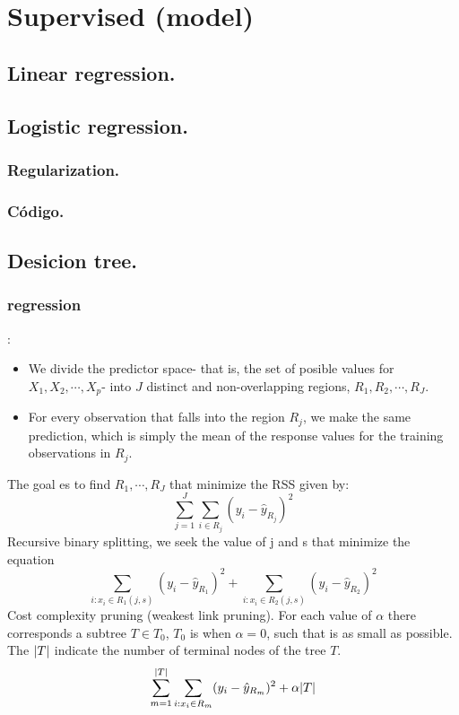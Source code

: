 \documentclass[12pt, a4paper]{book}
\begin{document}
\part{Supervised (model)}
\chapter{Linear regression.}

\chapter{Logistic regression.}
\section{Regularization.}
\section{Código.}

\chapter{Desicion tree.}


\section{regression}:
\begin{itemize}
	\item We divide the predictor space- that is, the set of posible values for $X_1, X_2, \cdots ,X_p$- into $J$ distinct and non-overlapping regions, $R_1,R_2,\cdots ,R_J$.
	\item For every observation that falls into the region $R_j$, we make the same prediction, which is simply the mean of the response values for the training observations in $R_j$.
\end{itemize}
The goal es to find $R_1,\cdots,R_J$ that minimize the RSS given by:
\begin{equation}
	\sum_{j=1}^{J}\sum_{i \in R_j}(y_i-\hat{y}_{R_j})^2
\end{equation}
Recursive binary splitting, we seek the value of j and s that minimize the equation
\begin{equation}
	\sum_{i:x_i\in R_1(j,s)}(y_i-\hat{y}_{R_1})^2+\sum_{i:x_i\in R_2(j,s)}(y_i-\hat{y}_{R_2})^2
\end{equation}
Cost complexity pruning (weakest link pruning). For each value of  $\alpha$ there corresponds a subtree $T\in T_0$, $T_0$ is when $\alpha=0$, such that is as small as possible. The $\abs{T}$ indicate the number of terminal nodes of the tree $T$.
\begin{equation}
	\sum_{m=1}^{\abs{T}}\sum_{i:x_i\in R_m} (y_i-\hat{y}_{R_m})^2 +\alpha \abs{T}
\end{equation}
\end{document}
